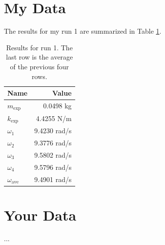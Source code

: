 \section{My Data}
The results for my run 1 are summarized in Table \ref{table.11.results}.
\begin{table}
    \centering
    \begin{tabular}{|l|r|}
        \hline
        Name & Value \\
        \hline
        $m_{\text{exp}}$ & 0.0498 kg \\
        $k_{\text{exp}}$ & 4.4255 N/m \\
        $\omega_{1}$ & 9.4230 rad/s \\
        $\omega_{2}$ & 9.3776 rad/s \\
        $\omega_{3}$ & 9.5802 rad/s \\
        $\omega_{4}$ & 9.5796 rad/s \\
        \hline
        $\omega_{\text{ave}}$ & 9.4901 rad/s \\
        \hline
    \end{tabular}
    \caption{Results for run 1. The last row is the average of the previous four rows.}
    \label{table.11.results}
\end{table}
\section{Your Data}
...
